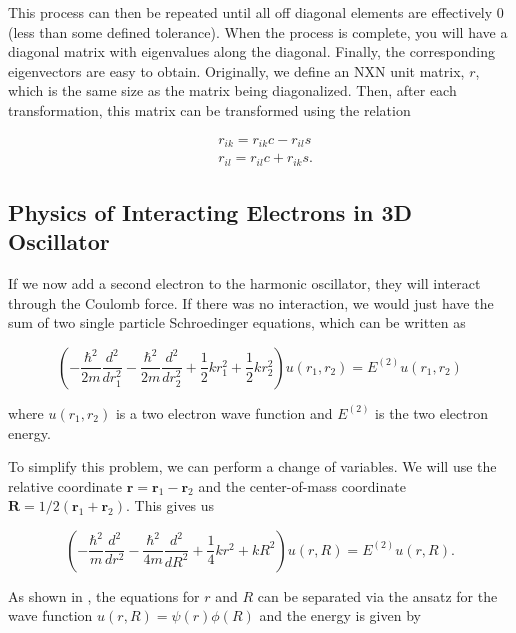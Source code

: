 \documentclass[%
oneside,                 %
final,                   %
10pt]{article}
\begin{document}
This process can then be repeated until all off diagonal elements are effectively 0 (less than some defined tolerance).  When the process is complete, you will have a diagonal matrix with eigenvalues along the diagonal.  Finally, the corresponding eigenvectors are easy to obtain.  Originally, we define an NXN unit matrix, $r$, which is the same size as the matrix being diagonalized.  Then, after each transformation, this matrix can be transformed using the relation

\begin{equation*}
\begin{split}
&r_{ik} = r_{ik}c-r_{il}s \\
&r_{il} = r_{il}c + r_{ik}s.
\end{split}
\end{equation*}

\subsection{Physics of Interacting Electrons in 3D Oscillator}

If we now add a second electron to the harmonic oscillator, they will interact through the Coulomb force.  If there was no interaction, we would just have the sum of two single particle Schroedinger equations, which can be written as 

\begin{equation*}
\left(  -\frac{\hbar^2}{2 m} \frac{d^2}{dr_1^2} -\frac{\hbar^2}{2 m} \frac{d^2}{dr_2^2}+ \frac{1}{2}k r_1^2+ \frac{1}{2}k r_2^2\right)u(r_1,r_2)  = E^{(2)} u(r_1,r_2) 
\end{equation*}


where $u(r_1,r_2)$ is a two electron wave function and $E^{(2)}$ is the two electron energy.

To simplify this problem, we can perform a change of variables.  We will use the relative coordinate $\mathbf{r} = \mathbf{r}_1-\mathbf{r}_2$
and the center-of-mass coordinate $\mathbf{R} = 1/2(\mathbf{r}_1+\mathbf{r}_2)$.  This gives us

\begin{equation*}
\left(  -\frac{\hbar^2}{m} \frac{d^2}{dr^2} -\frac{\hbar^2}{4 m} \frac{d^2}{dR^2}+ \frac{1}{4} k r^2+  kR^2\right)u(r,R)  = E^{(2)} u(r,R).
\end{equation*}

As shown in \cite{Broida}, the equations for $r$ and $R$ can be separated via the ansatz for the 
wave function $u(r,R) = \psi(r)\phi(R)$ and the energy is given by
\end{document}
